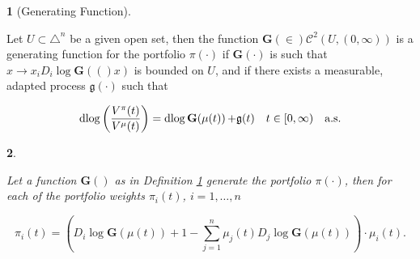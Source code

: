 \documentclass[british]{amsart} \usepackage{lmodern}
\numberwithin{equation}{section} \numberwithin{figure}{section}
\theoremstyle{plain} \newtheorem{thm}{\protect\theoremname}[section]
\theoremstyle{definition} \newtheorem{defn}[thm]{\protect\definitionname}
\theoremstyle{plain} \newtheorem{assumption}[thm]{\protect\assumptionname}
\theoremstyle{plain} \newtheorem{lem}[thm]{\protect\lemmaname}
\theoremstyle{plain} \newtheorem{prop}[thm]{\protect\propositionname}
\theoremstyle{remark} \newtheorem{rem}[thm]{\protect\remarkname}
\theoremstyle{plain} \newtheorem{cor}[thm]{\protect\corollaryname}
\renewcommand{\d}[1]{\mathop{\mathrm{d}{#1}}}
\newcommand{\rangei}{i=1,\dots,n} \newcommand{\measure}{\mathbb{P}}
\begin{document}
\newcommand{\G}[1]{\mathbf{G}(#1)}
\newcommand{\Gmu}{\G{\mu(t)}}
\newcommand{\g}{\mathfrak{g}(t)}

\begin{defn} [Generating Function] 
  \label{def:generatingfunction}

  Let $U \subset \triangle^{n}$ be a given open set, then the function
  $\G\in\mathcal{C}^{2}(U,(0,\infty))$ is a generating function for the
  portfolio $\pi(\cdot)$ if $\G{\cdot}$ is such that $x\to
  x_{i}D_{i}\log\G(x)$ is bounded on $U$, and if there exists a
  measurable, adapted process $\mathfrak{g}(\cdot)$ such that 

  \begin{equation}
    \d{ \log \left( \frac{V^{\pi}(t)}{V^{\mu}(t)} \right) } = 
    \d{\log{\Gmu}} + \g 
    \quad \ranget
    \quad \almostsurely
  \end{equation}

\end{defn}

\begin{prop} 
  \label{prop:generatingfunction}

  Let a function $\G{}$ as in Definition \ref{def:generatingfunction}
  generate the portfolio $\pi(\cdot)$, then for each of the portfolio weights
  $\pi_{i}(t)$, $\rangei$

  \begin{equation}
    \label{eq:portfoliogeneratedbyG}
    \pi_{i}(t) = 
      \left( 
        D_{i}\log{\Gmu} + 1 - 
          \sum_{j=1}^{n} \mu_{j}(t) D_{j} \log{\Gmu}
      \right) \cdot \mu_{i}(t).
  \end{equation}

\end{prop}
\end{document}
